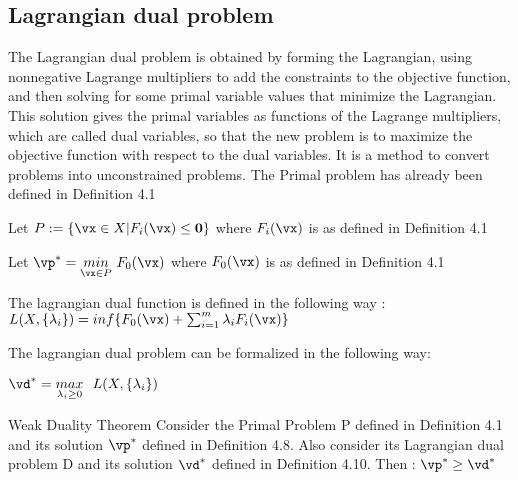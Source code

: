 \documentclass[a4paper,11pt]{article}
\begin{document}
\subsection{Lagrangian dual problem}
The Lagrangian dual problem is obtained by forming the Lagrangian, using nonnegative Lagrange multipliers to add the constraints to the objective function, and then solving for some primal variable values that minimize the Lagrangian. This solution gives the primal variables as functions of the Lagrange multipliers, which are called dual variables, so that the new problem is to maximize the objective function with respect to the dual variables.\cite{wiki:002} It is a method to convert problems into unconstrained problems.
\newline
The Primal problem has already been defined in Definition 4.1
\newline

\begin{definition}
Let \(  P := \{ \vx \in X | F_i(\vx) \leq \vzero \} \) where $F_i(\vx)$ is as defined in Definition 4.1 
\end{definition}

\begin{definition}
Let \( \vp^* = \underset{\vx \in P}{min}\,\, F_0(\vx)\) where $F_0(\vx)$ is as defined in Definition 4.1
\end{definition}

\begin{definition}
The lagrangian dual function is defined in the following way : \newline \newline
\( L(X,\{\lambda_i\})= inf\{ F_0(\vx) + \sum_{i=1}^{m} \lambda_i F_i(\vx) \}\)
\end{definition}

\begin{definition}
The lagrangian dual problem can be formalized in the following way: \newline \newline
\centerline{\( \vd^*= \underset{\lambda_i \geq 0}{max} \,\,\,\,  L(X,\{\lambda_i\}) \)}
\end{definition}

\begin{theorem}
Weak Duality Theorem \newline \newline
Consider the Primal Problem P defined in Definition 4.1 and its solution $\vp^*$ defined in Definition 4.8. Also consider its Lagrangian dual problem D and its solution $\vd^*$ defined in Definition 4.10.  Then : \newline
\( \vp^* \geq \vd^* \)
\end{theorem}
\end{document}
